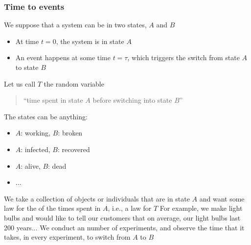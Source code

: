 \documentclass[aspectratio=169]{beamer}\usepackage[]{graphicx}\usepackage[]{xcolor}
\begin{document}
\begin{frame}\frametitle{Time to events}
We suppose that a system can be in two states, $A$ and $B$
\begin{itemize}
\item At time $t=0$, the system is in state $A$
\item An event happens at some time $t=\tau$, which triggers the switch from
state $A$ to state $B$
\end{itemize}
\vfill
Let us call $T$ the random variable 
\begin{quote}
``time spent in state $A$ before switching into state $B$''
\end{quote}
\end{frame}

\begin{frame}
The states can be anything:
\begin{itemize}
\item $A$: working, $B$: broken
\item $A$: infected, $B$: recovered
\item $A$: alive, $B$: dead
\item $\ldots$
\end{itemize}
\vfill
We take a collection of objects or individuals that are in state $A$ and want
some law for the  of the times spent in $A$, i.e., a law for $T$
\vfill
For example, we make light bulbs and would like to tell our customers that on average, our light bulbs last 200 years...
\vfill
We conduct an  number of experiments, and observe the time that it takes, in every experiment, to switch from $A$ to $B$
\end{frame}
\end{document}
